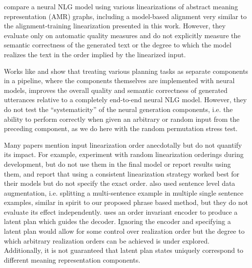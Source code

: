 \citet{castroferreira2017} compare a neural NLG model using various
linearizations of abstract meaning representation (AMR) graphs, including a
model-based alignment very similar to the alignment-training linearization
presented in this work. However, they evaluate only on automatic quality
measures and do not explicitly measure the semantic correctness of the
generated text or the degree to which the model realizes the text in the order
implied by the linearized input.

Works like \citet{moryossef2019a,moryossef2019b} and \citet{castroferreira2019}
show that treating various planning tasks as separate components in a pipeline,
where the components themselves are implemented with neural models, improves
the overall quality and semantic correctness of generated utterances relative
to a completely end-to-end neural NLG model. However, they do not test the
``systematicity'' of the neural generation components, i.e. the ability to
perform correctly when given an arbitrary or random input from the preceding
component, as we do here with the random permutation stress test.

Many papers mention input linearization order anecdotally but do not quantify
its impact. For example, \citet{juraska2018} experiment with random
linearization orderings during development, but do not use them in the final
model or report results using them, and \citet{gehrmann2018} report that using
a consistent linearization strategy worked best for their models but do not
specify the exact order.  \citet{juraska2018} also used sentence level data
augmentation, i.e. splitting a multi-sentence example in multiple single
sentence examples, similar in spirit to our proposed phrase based method, but
they do not evaluate its effect independently.  \citet{wiseman2018} uses an
order invariant encoder to produce a latent plan which guides the decoder.
Ignoring the encoder and specifying a latent plan would allow for some control
over realization order but the degree to which arbitrary realization orders can
be achieved is under explored. Additionally, it is not guaranteed that latent
plan states uniquely correspond to different meaning representation components.

